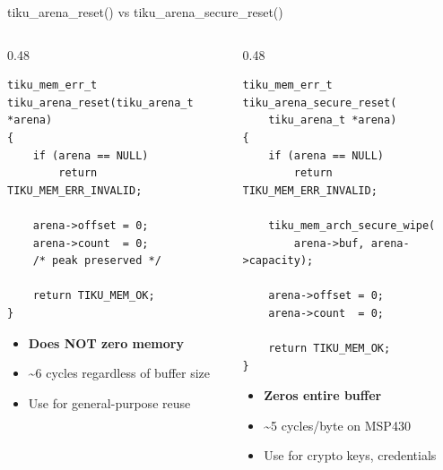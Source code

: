 \documentclass[aspectratio=169, 10pt]{beamer}
\begin{document}
\begin{frame}[fragile]{tiku\_arena\_reset() vs tiku\_arena\_secure\_reset()}
\begin{columns}[T]
\begin{column}{0.48\textwidth}
\begin{lstlisting}[style=cstyle, title={Normal reset --- O(1)}]
tiku_mem_err_t
tiku_arena_reset(tiku_arena_t *arena)
{
    if (arena == NULL)
        return TIKU_MEM_ERR_INVALID;

    arena->offset = 0;
    arena->count  = 0;
    /* peak preserved */

    return TIKU_MEM_OK;
}
\end{lstlisting}

\begin{itemize}
  \item \textbf{Does NOT zero memory}
  \item \textasciitilde6 cycles regardless of buffer size
  \item Use for general-purpose reuse
\end{itemize}
\end{column}

\begin{column}{0.48\textwidth}
\begin{lstlisting}[style=cstyle, title={Secure reset --- O(n)}]
tiku_mem_err_t
tiku_arena_secure_reset(
    tiku_arena_t *arena)
{
    if (arena == NULL)
        return TIKU_MEM_ERR_INVALID;

    tiku_mem_arch_secure_wipe(
        arena->buf, arena->capacity);

    arena->offset = 0;
    arena->count  = 0;

    return TIKU_MEM_OK;
}
\end{lstlisting}

\begin{itemize}
  \item \textbf{Zeros entire buffer}
  \item \textasciitilde5 cycles/byte on MSP430
  \item Use for crypto keys, credentials
\end{itemize}
\end{column}
\end{columns}
\end{frame}
\end{document}
